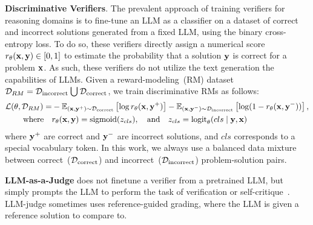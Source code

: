 \textbf{Discriminative Verifiers}. The prevalent approach of training verifiers for reasoning domains is to fine-tune an LLM as a classifier on a dataset of correct and incorrect solutions generated from a fixed LLM, using the binary cross-entropy loss. To do so, these verifiers directly assign a numerical score $r_\theta({\mathbf{x}}, {\mathbf{y}}) \in [0, 1]$ to estimate the probability that a solution ${\mathbf{y}}$ is correct for a problem ${\mathbf{x}}$. As such, these verifiers do not utilize the text generation the capabilities of LLMs. Given a reward-modeling~(RM) dataset $\gD_{RM} = \gD_{\text{incorrect}} \union \gD_{\text{correct}}$, we train discriminative RMs as follows:
\begin{align}
{\mathcal{L}}(\theta, {\mathcal{D}}_{RM}) =& -\mathbb{E}_{({\mathbf{x}}, {\mathbf{y}}^+) \sim {\mathcal{D}}_{\text{correct}}} \left[ \log r_\theta({\mathbf{x}}, {\mathbf{y}}^+)\right] -\mathbb{E}_{({\mathbf{x}}, {\mathbf{y}}^-) \sim {\mathcal{D}}_{\text{incorrect}}} \left[\log (1 - r_\theta({\mathbf{x}}, {\mathbf{y}}^-)) \right],\nonumber\\
\quad \text{where} \quad &r_\theta({\mathbf{x}}, {\mathbf{y}}) = \text{sigmoid}(z_{cls}), \quad \text{and} \quad z_{cls}=\mathrm{logit}_\theta(cls \mid {\mathbf{y}}, {\mathbf{x}})\label{eq:disc}
\end{align}
where ${\mathbf{y}}^+$ are correct and ${\mathbf{y}}^-$  are incorrect solutions, and
$cls$ corresponds to a special vocabulary token. In this work, we always use a balanced data mixture between correct~(${\mathcal{D}}_{\text{correct}}$) and incorrect~(${\mathcal{D}}_{\text{incorrect}}$) problem-solution pairs.

\textbf{LLM-as-a-Judge} does not finetune a verifier from a pretrained LLM, but simply prompts the LLM to perform the task of verification or self-critique~\citep{zheng2024judging, bai2022constitutional}. LLM-judge sometimes uses reference-guided grading, where the LLM is given a reference solution to compare to.
